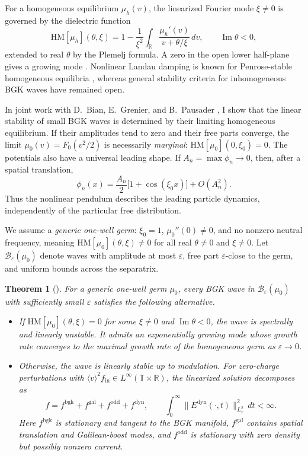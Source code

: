 \documentclass[10pt,reqno]{amsart}
\newtheorem{theorem}{Theorem}
\newcommand{\R}{\mathbb R}
\newcommand{\HM}{\mathrm{HM}}
\begin{document}
For a homogeneous equilibrium $\mu_h(v)$, the linearized Fourier mode $\xi\neq0$ is governed by the dielectric function
\begin{equation}\label{eq:dielectric}
\HM[\mu_h](\theta,\xi)=1-\frac1{\xi^2}\int_\R
\frac{\mu_h'(v)}{v+\theta/\xi}\,dv,\qquad \operatorname{Im}\theta<0,
\end{equation}
extended to real $\theta$ by the Plemelj formula. A zero in the open lower half-plane gives a growing mode \cite{L46,P60}. Nonlinear Landau damping is known for Penrose-stable homogeneous equilibria \cite{MV11,BMM16,GNR21,IPWW24b}, whereas general stability criteria for inhomogeneous BGK waves have remained open.

In joint work with D.~Bian, E.~Grenier, and B.~Pausader \cite{BGHP26}, I show that the linear stability of small BGK waves is determined by their limiting homogeneous equilibrium. If their amplitudes tend to zero and their free parts converge, the limit $\mu_0(v)=F_0(v^2/2)$ is necessarily \emph{marginal}: $\HM[\mu_0](0,\xi_0)=0$. The potentials also have a universal leading shape. If $A_n=\max\phi_n\to0$, then, after a spatial translation,
\[
\phi_n(x)=\frac{A_n}{2}\bigl[1+\cos(\xi_0x)\bigr]+O(A_n^2).
\]
Thus the nonlinear pendulum describes the leading particle dynamics, independently of the particular free distribution.

We assume a \emph{generic one-well germ}: $\xi_0=1$, $\mu_0''(0)\neq0$, and no nonzero neutral frequency, meaning $\HM[\mu_0](\theta,\xi)\neq0$ for all real $\theta\neq0$ and $\xi\neq0$. Let $\mathcal B_\varepsilon(\mu_0)$ denote waves with amplitude at most $\varepsilon$, free part $\varepsilon$-close to the germ, and uniform bounds across the separatrix.

\begin{theorem}[\cite{BGHP26}]\label{thm:bgk}
For a generic one-well germ $\mu_0$, every BGK wave in $\mathcal B_\varepsilon(\mu_0)$ with sufficiently small $\varepsilon$ satisfies the following alternative.
\begin{itemize}
\item If $\HM[\mu_0](\theta,\xi)=0$ for some $\xi\neq0$ and $\operatorname{Im}\theta<0$, the wave is spectrally and linearly unstable. It admits an exponentially growing mode whose growth rate converges to the maximal growth rate of the homogeneous germ as $\varepsilon\to0$.
\item Otherwise, the wave is linearly stable up to modulation. For zero-charge perturbations with $\langle v\rangle^2 f_{\mathrm{in}}\in L^\infty(\mathbb T\times\R)$, the linearized solution decomposes as
\[
f=f^{\mathrm{bgk}}+f^{\mathrm{gal}}+f^{\mathrm{odd}}+f^{\mathrm{dyn}},
\qquad
\int_0^\infty\|E^{\mathrm{dyn}}(\cdot,t)\|_{L_x^2}^2\,dt<\infty.
\]
Here $f^{\mathrm{bgk}}$ is stationary and tangent to the BGK manifold, $f^{\mathrm{gal}}$ contains spatial translation and Galilean-boost modes, and $f^{\mathrm{odd}}$ is stationary with zero density but possibly nonzero current.
\end{itemize}
\end{theorem}
\end{document}
